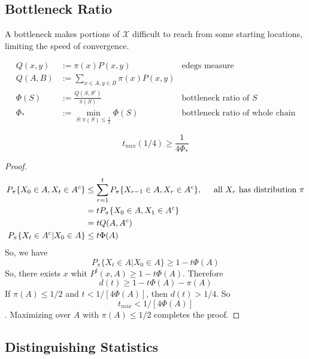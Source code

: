 \subsection{Bottleneck Ratio}
A bottleneck makes portions of $\mathcal{X}$ difficult to reach from some starting locations, limiting the speed of convergence.
\begin{define}
  \begin{align*}
    Q(x, y) &:= \pi(x)P(x, y)  & \mbox{edegs measure}\\
    Q(A, B) &:= \sum_{x\in A, y\in B} \pi(x)P(x, y) & \\
    \Phi(S) &:= \frac{Q(S, S^c)}{\pi(S)} & \mbox{bottleneck ratio of $S$}\\
    \Phi_* &:= \min_{S:\pi(S)\leq \frac{1}{2}} \Phi(S) & \mbox{bottleneck ratio of whole chain}
  \end{align*}
\end{define}
\begin{theorem}
  \[t_{mix}(1/4) \geq \frac{1}{4\Phi_*}\]
\end{theorem}
\begin{proof}
  \begin{align*}
    P_{\pi}\{X_0\in A, X_t\in A^c\} &\leq \sum_{r=1}^t P_{\pi} \{X_{r-1}\in A, X_r\in A^c\}, \hspace{0.5cm} \mbox{all $X_r$ has distribution $\pi$} \\
                                    &= tP_{\pi}\{X_0\in A, X_1\in A^c\} \\
                                    &= tQ(A, A^c) \\
    P_{\pi}\{X_t\in A^c | X_0\in A\} &\leq t\Phi(A) 
  \end{align*}
  So, we have
  \[P_{\pi}\{X_t\in A | X_0\in A\} \geq 1 - t\Phi(A)\]
  So, there exists $x$ whit $P^t(x, A) \geq 1 - t\Phi(A)$.
  Therefore
  \[d(t) \geq 1 - t\Phi(A) - \pi(A)\]
  If $\pi(A) \leq 1/2$ and $t < 1/[4\Phi(A)]$, then $d(t) > 1/4$.
  So
  \[t_{mix} < 1/[4\Phi(A)]\].
  Maximizing over $A$ with $\pi(A)\leq 1/2$ completes the proof.
\end{proof}

\subsection{Distinguishing Statistics}


